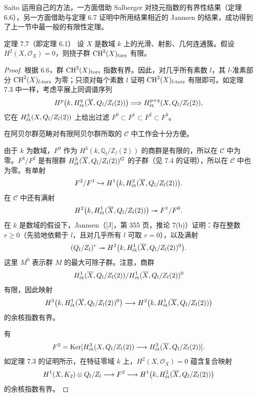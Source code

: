 Saito 运用自己的方法，一方面借助 Salberger 对挠元指数的有界性结果（定理 6.6），另一方面借助与定理 6.7 证明中所用结果相近的 Jannsen 的结果，成功得到了上一节中最一般的有限性定理。
\begin{statement}{定理 7.7（即定理 6.1）}
设 $X$ 是数域 $k$ 上的光滑、射影、几何连通簇。假设 $H^2(X,\mathcal O_X)=0$，则挠子群 $\operatorname{CH}^2(X)_{\mathrm{tors}}$ 有限。
\end{statement}
\begin{proof}
根据 6.6，群 $\operatorname{CH}^2(X)_{\mathrm{tors}}$ 指数有界。因此，对几乎所有素数 $l$，其 $l$-准素部分 $\operatorname{CH}^2(X)_{l\text{-}\mathrm{tors}}$ 为零；只须对每个素数 $l$ 证明 $\operatorname{CH}^2(X)_{l\text{-}\mathrm{tors}}$ 有限即可。如定理 7.3 中一样，考虑平展上同调谱序列
\[
 H^p\bigl(k,H^q_{\mathrm{\acute et}}(\overline X,Q_l/Z_l(2))\bigr)
 \Longrightarrow H^{p+q}_{\mathrm{\acute et}}(X,Q_l/Z_l(2)),
\]
它在 $H^3_{\mathrm{\acute et}}(X,Q_l/Z_l(2))$ 上给出过滤
$F^0\subset F^1\subset F^2\subset F^3$。

在阿贝尔群范畴对有限阿贝尔群所取的 $\mathcal C$ 中工作会十分方便。

由于 $k$ 为数域，$F^0$ 作为 $H^3(k,\mathbb Q_l/\mathbb Z_l(2))$ 的商群是有限的，所以在 $\mathcal C$ 中为零。$F^3/F^2$ 是有限群 $H^3_{\mathrm{\acute et}}(\overline X,Q_l/Z_l(2))^G$ 的子群（见 7.4 的证明），所以在 $\mathcal C$ 中也为零。有单射
\[
 F^2/F^1\hookrightarrow H^1\bigl(k,H^2_{\mathrm{\acute et}}(\overline X,Q_l/Z_l(2))\bigr).
\]
在 $\mathcal C$ 中还有满射
\[
 H^2\bigl(k,H^1_{\mathrm{\acute et}}(\overline X,Q_l/Z_l(2))\bigr)
 \twoheadrightarrow F^1/F^0.
\]
在 $k$ 是数域的假设下，Jannsen（[J]，第 355 页，推论 7(b)）证明：存在整数 $r\ge0$（先验地依赖于 $l$，且对几乎所有 $l$ 可取 $r=0$），以及满射
\[
 (Q_l/Z_l)^r\twoheadrightarrow
 H^2\bigl(k,H^1_{\mathrm{\acute et}}(\overline X,Q_l/Z_l(2))^0\bigr).
\]
这里 $M^0$ 表示群 $M$ 的最大可除子群。注意，商群
\[
 H^1_{\mathrm{\acute et}}(\overline X,Q_l/Z_l(2))
 /H^1_{\mathrm{\acute et}}(\overline X,Q_l/Z_l(2))^0
\]
有限，因此映射
\[
 H^2\bigl(k,H^1_{\mathrm{\acute et}}(\overline X,Q_l/Z_l(2))^0\bigr)
 \longrightarrow H^2\bigl(k,H^1_{\mathrm{\acute et}}(\overline X,Q_l/Z_l(2))\bigr)
\]
的余核指数有界。

有
\[
 F^2=\operatorname{Ker}[H^3_{\mathrm{\acute et}}(X,Q_l/Z_l(2))
 \longrightarrow H^3_{\mathrm{\acute et}}(\overline X,Q_l/Z_l(2))].
\]
如定理 7.3 的证明所示，在特征零域 $k$ 上，$H^2(X,\mathcal O_X)=0$ 蕴含复合映射
\[
 H^1(X,K_2)\otimes Q_l/Z_l
 \longrightarrow F^2
 \longrightarrow H^1\bigl(k,H^2_{\mathrm{\acute et}}(\overline X,Q_l/Z_l(2))\bigr)
\]
的余核指数有界。


\end{proof}
